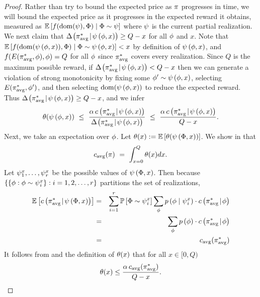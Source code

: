 \begin{proof}
Rather than try to bound the expected price as 
$\policy$ progresses in time, we will bound the expected price as 
it progresses in the expected reward it obtains, measured as $\progress{\prlz}$ 
where $\prlz$ is the current partial realization.
We next claim that $\diff{\ptrace{\rlz}{x}}{\piavg } \ge Q - x$
for all $\rlz$ and $x$.  Note that 
$\progress{\ptrace{\rlz}{x}} < x$ by definition of
$\ptrace{\rlz}{x}$, and 
$f(\played{\piavg}{\rlz}, \rlz) = Q$ for all $\rlz$ since $\piavg$ covers
every realization.  Since $Q$ is the maximum possible reward, 
if $\diff{\ptrace{\rlz}{x}}{\piavg } < Q - x$ then we can generate a
violation of strong \term monotonicity by 
fixing some $\rlz' \sim \ptrace{\rlz}{x}$, selecting 
$\played{\piavg}{\rlz'}$, and then selecting
$\dom(\ptrace{\rlz}{x})$ to reduce the expected reward.
Thus $\diff{\ptrace{\rlz}{x}}{\piavg } \ge Q - x$, and we infer 
\begin{equation}
   \label{eq:1app-avg}
\price(\ptrace{\rlz}{x})  \ \le \  \frac{\alpha \, \condcost{\ptrace{\rlz}{x}}{\piavg} } {
  \diff{\ptrace{\rlz}{x}}{ \piavg } }\  \le \ \frac{\alpha \, \condcost{\ptrace{\rlz}{x}}{\piavg} } {
  Q - x}.  
 \end{equation}
Next, we take an expectation over $\rlz$.  Let 
$\price(x) := \expctoverrlz{\rlz}{\price(\ptrace{\rvrlz}{x})}$.
We show in  that 
\begin{equation}
   \label{eq:price-integral}
\acst{\policy} \ = \ \int_{x=0}^{Q} \price(x) dx\mbox{.}
\end{equation}
Let $\prlz^x_1, \ldots, \prlz^x_r$ be the possible values of 
$\ptrace{\rvrlz}{x}$.
Then because $\set{\set{\rlz : \rlz \sim \prlz^x_i} : i = 1, 2,
  \ldots, r}$ partitions the set of realizations, 
\begin{eqnarray}
\expctoverrlz{\rvrlz}{  \condcost{\ptrace{\rvrlz}{x}}{\piavg}  }  & = &
\sum_{i=1}^r \Pr{\rvrlz \sim \prlz^x_i} \sum_{\rlz} \rlzmass{ \rlz  \mid \prlz^x_i}
\cdot \condcost{\rlz}{\piavg}\\
 & = & \sum_{\rlz}  \rlzprior \cdot \condcost{\rlz}{\piavg}\\
 & = & \acst{\piavg}
\end{eqnarray}
It follows from  and the definition of $\price(x)$
that for all $x \in [0, Q)$
%
\begin{equation}
  \label{eq:3app-avg}
\price(x) \le \frac{\alpha \, \acst{\piavg}} {Q - x }.
\end{equation}
%

%
%
%
%
%
%
%
%
%


\end{proof}
